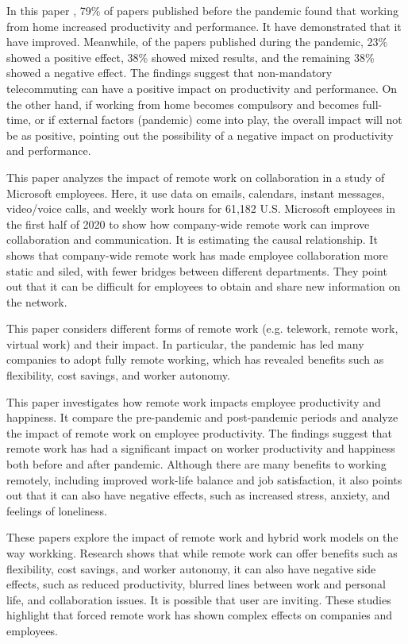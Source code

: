 \documentclass[12pt]{article}
\begin{document}
In this paper \cite{10.1371/journal.pone.0274728}, 79\% of papers published
before the pandemic found
that working from home
increased productivity and performance. It have demonstrated that it have
improved. Meanwhile, of the papers published during the pandemic, 23\% showed a
positive effect, 38\% showed mixed results, and the remaining 38\% showed a
negative effect. The findings suggest that non-mandatory telecommuting can have
a positive impact on productivity and performance. On the other hand, if
working from home becomes compulsory and becomes full-time, or if external
factors (pandemic) come into play, the overall impact will not be as positive,
pointing out the possibility of a negative impact on productivity and
performance.

This paper \cite{Yang2022} analyzes the
impact of remote work on collaboration in a study of Microsoft employees.
Here, it use data on emails, calendars, instant messages, video/voice calls,
and weekly work hours for 61,182 U.S. Microsoft employees in the first half of
2020 to show how company-wide remote work can improve collaboration and
communication. It is estimating the causal relationship. It shows that
company-wide remote work has made employee collaboration more static and siled,
with fewer bridges between different departments. They point out that it can be
difficult for employees to obtain and share new information on the network.

This paper \cite{inproceedings} considers different forms of remote work (e.g.
telework, remote work, virtual
work) and their impact. In particular, the pandemic has led many companies to
adopt fully remote working, which has revealed benefits such as flexibility,
cost savings, and worker autonomy.

This paper \cite{SJ2023} investigates
how remote work impacts employee productivity and happiness. It compare the
pre-pandemic and post-pandemic periods and analyze the impact of remote work on
employee productivity. The findings suggest that remote work has
had a significant impact on worker productivity and happiness both before and
after pandemic. Although there are many benefits to working remotely, including
improved work-life balance and job satisfaction, it also points out that it can
also have negative effects, such as increased stress, anxiety, and feelings of
loneliness.

These papers explore the impact of remote work and hybrid work models on the
way workking. Research shows that while remote work can offer benefits such as
flexibility, cost savings, and worker autonomy, it can also have negative side
effects, such as reduced productivity, blurred lines between work and personal
life, and collaboration issues. It is possible that user are inviting. These
studies highlight that forced remote work has shown complex effects on
companies and employees.
\end{document}
